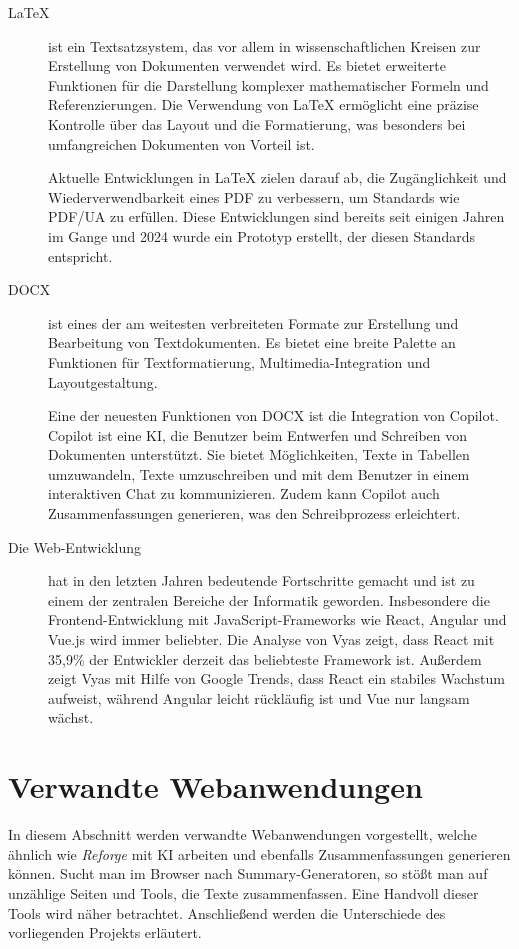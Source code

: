 \begin{description}
    \item[LaTeX] ist ein Textsatzsystem, das vor allem in wissenschaftlichen Kreisen zur Erstellung von Dokumenten verwendet wird. Es bietet erweiterte Funktionen für die Darstellung komplexer mathematischer Formeln und Referenzierungen. Die Verwendung von LaTeX ermöglicht eine präzise Kontrolle über das Layout und die Formatierung, was besonders bei umfangreichen Dokumenten von Vorteil ist.

    Aktuelle Entwicklungen in LaTeX zielen darauf ab, die Zugänglichkeit und Wiederverwendbarkeit eines \ac{PDF} zu verbessern, um Standards wie \ac{PDF}/\ac{UA} zu erfüllen. Diese Entwicklungen sind bereits seit einigen Jahren im Gange und 2024 wurde ein Prototyp erstellt, der diesen Standards entspricht.  \cite{mittelbach2024accessible}
    
    \item[\ac{DOCX}] ist eines der am weitesten verbreiteten Formate zur Erstellung und Bearbeitung von Textdokumenten. Es bietet eine breite Palette an Funktionen für Textformatierung, Multimedia-Integration und Layoutgestaltung.
    
    Eine der neuesten Funktionen von \ac{DOCX} ist die Integration von Copilot. Copilot ist eine \ac{KI}, die Benutzer beim Entwerfen und Schreiben von Dokumenten unterstützt. Sie bietet Möglichkeiten, Texte in Tabellen umzuwandeln, Texte umzuschreiben und mit dem Benutzer in einem interaktiven Chat zu kommunizieren. Zudem kann Copilot auch Zusammenfassungen generieren, was den Schreibprozess erleichtert. \cite{microsoft_copilot}
    
    \item[Die Web-Entwicklung]hat in den letzten Jahren bedeutende Fortschritte gemacht und ist zu einem der zentralen Bereiche der Informatik geworden. Insbesondere die Frontend-Entwicklung mit JavaScript-Frameworks wie React, Angular und Vue.js wird immer beliebter. Die Analyse von Vyas zeigt, dass React mit 35,9\% der Entwickler derzeit das beliebteste Framework ist. Außerdem zeigt Vyas mit Hilfe von Google Trends, dass React ein stabiles Wachstum aufweist, während Angular leicht rückläufig ist und Vue nur langsam wächst. \cite{vyas2022comparative} 
    
\end{description}

\section{Verwandte Webanwendungen}
In diesem Abschnitt werden verwandte Webanwendungen vorgestellt, welche ähnlich wie \textit{Reforge} mit \ac{KI} arbeiten und ebenfalls Zusammenfassungen generieren können. Sucht man im Browser nach Summary-Generatoren, so stößt man auf unzählige Seiten und Tools, die Texte zusammenfassen. Eine Handvoll dieser Tools wird näher betrachtet. Anschließend werden die Unterschiede des vorliegenden Projekts erläutert.

